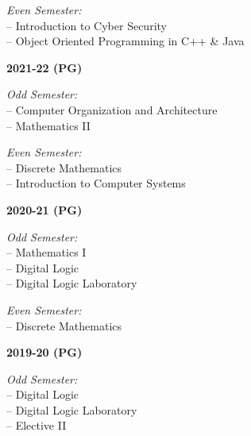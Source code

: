 \documentclass[11pt,a4paper]{moderncv}
\begin{document}
\begin{adjustwidth}{6em}{0pt}
\begin{adjustwidth}{2em}{0pt}
		\textit{Even Semester:} \\
		\hspace*{1.5em}-- Introduction to Cyber Security \\
		\hspace*{1.5em}-- Object Oriented Programming in C++ \& Java \\
	\end{adjustwidth}
	

	
	\textbf{2021-22 (PG)}
	
	\begin{adjustwidth}{2em}{0pt}
		\textit{Odd Semester:} \\
		\hspace*{1.5em}-- Computer Organization and Architecture \\
		\hspace*{1.5em}-- Mathematics II 
		
		\textit{Even Semester:} \\
		\hspace*{1.5em}-- Discrete Mathematics \\
		\hspace*{1.5em}-- Introduction to Computer Systems \\
	\end{adjustwidth}
	

	
	\textbf{2020-21 (PG)}
	
	\begin{adjustwidth}{2em}{0pt}
		\textit{Odd Semester:} \\
		\hspace*{1.5em}-- Mathematics I \\
		\hspace*{1.5em}-- Digital Logic \\
		\hspace*{1.5em}-- Digital Logic Laboratory 
		
		\textit{Even Semester:} \\
		\hspace*{1.5em}-- Discrete Mathematics \\
	\end{adjustwidth}
	

	
	\textbf{2019-20 (PG)}
	
	\begin{adjustwidth}{2em}{0pt}
		\textit{Odd Semester:} \\
		\hspace*{1.5em}-- Digital Logic \\
		\hspace*{1.5em}-- Digital Logic Laboratory \\
		\hspace*{1.5em}-- Elective II 
		

\end{adjustwidth}
\end{adjustwidth}
\end{document}
